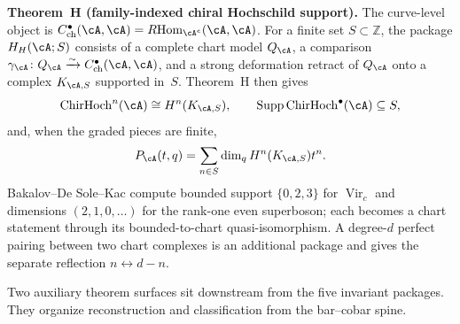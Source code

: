 \medskip

\noindent\textbf{Theorem~H (family-indexed chiral Hochschild
support).}\enspace
The curve-level object is
$C^\bullet_{\mathrm{ch}}(\cA,\cA)
=R\!\operatorname{Hom}_{\cA^e}(\cA,\cA)$.
For a finite set $S\subset\mathbb Z$, the package $H_H(\cA;S)$
consists of a complete chart model $Q_\cA$, a comparison
$\gamma_\cA\colon Q_\cA\xrightarrow{\sim}
C^\bullet_{\mathrm{ch}}(\cA,\cA)$, and a strong deformation retract
of $Q_\cA$ onto a complex $K_{\cA,S}$ supported in~$S$.  Theorem~H
then gives
\[
 \ChirHoch^n(\cA)\cong H^n(K_{\cA,S}),
 \qquad
 \operatorname{Supp}\ChirHoch^\bullet(\cA)\subseteq S,
\]
and, when the graded pieces are finite,
\[
 P_\cA(t,q)=\sum_{n\in S}\dim_qH^n(K_{\cA,S})t^n.
\]
Bakalov--De Sole--Kac compute bounded support $\{0,2,3\}$ for
$\operatorname{Vir}_c$ and dimensions $(2,1,0,\ldots)$ for the
rank-one even superboson; each becomes a chart statement through its
bounded-to-chart quasi-isomorphism.  A degree-$d$ perfect pairing
between two chart complexes is an additional package and gives the
separate reflection $n\leftrightarrow d-n$.

\medskip

Two auxiliary theorem surfaces sit downstream from the five invariant
packages. They organize reconstruction and classification from the
bar--cobar spine.

\medskip

